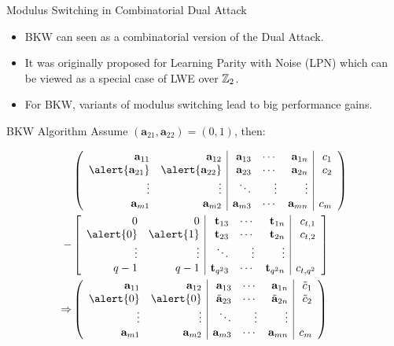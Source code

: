 \documentclass[presentation,smaller]{beamer}
\newcommand{\ZZ}[1][blank]{\ensuremath{\ifthenelse{\equal{#1}{blank}}{\mathbb{Z}}{\mathbb{Z}\left[#1\right]}\xspace}}
\renewcommand{\vec}[1]{\ensuremath{\mathbf{#1}}\xspace}
\newcommand{\shortvec}[1]{\tilde{\mathbf{#1}}\xspace}
\begin{document}
\begin{frame}[label={sec:orgheadline34}]{Modulus Switching in Combinatorial Dual Attack}
\begin{itemize}
\item BKW can seen as a combinatorial version of the Dual Attack.
\item It was originally proposed for Learning Parity with Noise (LPN) which can be viewed as a special case of LWE over \(\ZZ_{2}\).
\item For BKW, variants of modulus switching lead to big performance gains.
\end{itemize}
\end{frame}

\begin{frame}[label={sec:orgheadline35}]{BKW Algorithm}
Assume \((\vec{a}_{21},\vec{a}_{22}) = (0, 1)\), then:

\footnotesize
\begin{align*}
   & \left(
      \begin{array}{rr|rrr|r}
        \phantom{xn}\vec{a}_{11}         & \phantom{xn}\vec{a}_{12}         & \vec{a}_{13} & \cdots & \vec{a}_{1n} & c_1\\
        \alert{\vec{a}_{21}} & \alert{\vec{a}_{22}} & \vec{a}_{23} & \cdots & \vec{a}_{2n} & c_2\\
        \vdots               & \vdots               & \ddots       & \vdots & \vdots\\
        \vec{a}_{m1}         & \vec{a}_{m2}         & \vec{a}_{m3} & \cdots & \vec{a}_{mn} & c_{m}
      \end{array}
                                                                               \right)\\
  -& \left[
      \begin{array}{rr|rrr|r}
        0         & 0         & \vec{t}_{13}   & \cdots & \vec{t}_{1n}   & c_{t,1}\\
        \alert{0} & \alert{1} & \vec{t}_{23}   & \cdots & \vec{t}_{2n}   & c_{t,2}\\
        \vdots    & \vdots    & \ddots         & \vdots & \vdots\\
        q-1       & q-1       & \vec{t}_{q^23} & \cdots & \vec{t}_{q^2n} & c_{t,q^2}
        \end{array}\right]\\
   \Rightarrow &
     \left(\begin{array}{rr|rrr|r}
             \phantom{xn}\vec{a}_{11} & \phantom{xn}\vec{a}_{12} & \vec{a}_{13}      & \cdots & \vec{a}_{1n}      & \tilde{c}_1\\
             \alert{0}    & \alert{0}    & \shortvec{a}_{23} & \cdots & \shortvec{a}_{2n} & \tilde{c}_2\\
             \vdots       & \vdots       & \ddots            & \vdots & \vdots\\
             \vec{a}_{m1} & \vec{a}_{m2} & \vec{a}_{m3}      & \cdots & \vec{a}_{mn}      & c_{m}
           \end{array}\right)
  \end{align*}
\end{frame}
\end{document}
